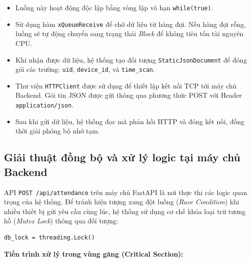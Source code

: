 \documentclass[12pt,a4paper]{report}
\begin{document}
\begin{itemize}

\item Luồng này hoạt động độc lập bằng vòng lặp vô hạn \texttt{while(true)}.

\item Sử dụng hàm \texttt{xQueueReceive} để chờ dữ liệu từ hàng đợi.
Nếu hàng đợi rỗng, luồng sẽ tự động chuyển sang trạng thái \textit{Block}
để không tiêu tốn tài nguyên CPU.

\item Khi nhận được dữ liệu, hệ thống tạo đối tượng 
\texttt{StaticJsonDocument} để đóng gói các trường:
\texttt{uid}, \texttt{device\_id}, và \texttt{time\_scan}.

\item Thư viện \texttt{HTTPClient} được sử dụng để thiết lập kết nối TCP
tới máy chủ Backend. Gói tin JSON được gửi thông qua phương thức POST
với Header \texttt{application/json}.

\item Sau khi gửi dữ liệu, hệ thống đọc mã phản hồi HTTP và đóng kết nối,
đồng thời giải phóng bộ nhớ tạm.

\end{itemize}

\subsection{Giải thuật đồng bộ và xử lý logic tại máy chủ Backend}

API \texttt{POST /api/attendance} trên máy chủ FastAPI là nơi thực thi
các logic quan trọng của hệ thống. Để tránh hiện tượng xung đột luồng
(\textit{Race Condition}) khi nhiều thiết bị gửi yêu cầu cùng lúc,
hệ thống sử dụng cơ chế khóa loại trừ tương hỗ (\textit{Mutex Lock})
thông qua đối tượng:

\begin{verbatim}
db_lock = threading.Lock()
\end{verbatim}

\textbf{Tiến trình xử lý trong vùng găng (Critical Section):}
\end{document}
